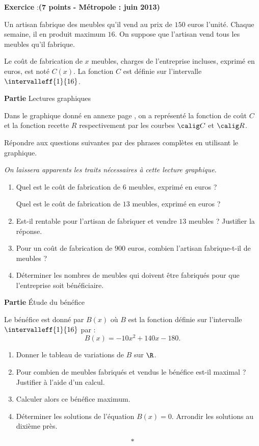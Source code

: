 \documentclass[11pt,french]{article}
\newcounter{exoc}
\newenvironment{exoc}[1]{%
  \refstepcounter{exoc}\textbf{Exercice \theexoc} :\hfill {\footnotesize\textbf{(#1)}}\par
  \medskip}%
{\medskip}
\begin{document}
\begin{exoc}{7 points - Métropole : juin 2013}\label{benefice}
Un artisan fabrique des meubles qu'il vend au prix de $150$ euros l'unité. Chaque semaine, il en produit maximum $16$. On suppose que l'artisan vend tous les meubles qu'il fabrique.\par
Le coût de fabrication de $x$ meubles, charges de l'entreprise incluses, exprimé en euros, est noté $C(x)$. La fonction $C$ est définie sur l'intervalle $\intervalleff{1}{16}$.\medskip

\textbf{Partie} \quad Lectures graphiques\medskip

Dans le graphique donné en annexe page \pageref{Annexe}, on a représenté la fonction de coût $C$ et la fonction recette $R$ respectivement par les courbes $\calig C$ et $\calig R$.\par
Répondre aux questions suivantes par des phrases complètes en utilisant le graphique.\par
\textit{On laissera apparents les traits nécessaires à cette lecture graphique.}

\begin{enumerate}
    \item Quel est le coût de fabrication de $6$ meubles, exprimé en euros ?\par Quel est le coût de fabrication de $13$ meubles, exprimé en euros ?
    \item Est-il rentable pour l'artisan de fabriquer et vendre $13$ meubles ? Justifier la réponse.
    \item Pour un coût de fabrication de $900$ euros, combien l'artisan fabrique-t-il de meubles ?
    \item Déterminer les nombres de meubles qui doivent être fabriqués pour que l'entreprise soit bénéficiaire.
\end{enumerate}\medskip

\textbf{Partie} \quad \'Etude du bénéfice\medskip

Le bénéfice est donné par $B(x)$ où $B$ est la fonction définie sur l'intervalle $\intervalleff{1}{16}$ par :\[B(x) = -10x^2 + 140x - 180.\]

\begin{enumerate}
    \item Donner le tableau de variations de $B$ sur $\R$.
    \item Pour combien de meubles fabriqués et vendus le bénéfice est-il maximal ? Justifier à l'aide d'un calcul.
    \item Calculer alors ce bénéfice maximum.
    \item Déterminer les solutions de l'équation $B(x) = 0$. Arrondir les solutions au dixième près.
\end{enumerate}

\end{exoc}\[*\]
\end{document}
